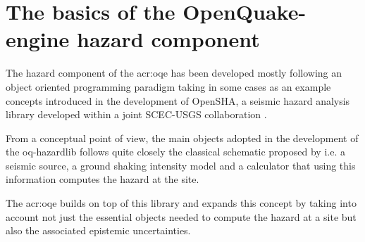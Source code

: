 \section{The basics of the OpenQuake-engine hazard component}
%
The hazard component of the \gls{acr:oqe} has been developed mostly following 
an object oriented programming paradigm taking in some cases as an example 
concepts introduced in the development of OpenSHA, a seismic hazard 
analysis library developed within a joint SCEC-USGS collaboration 
\parencite{field2003}. 

From a conceptual point of view, the main objects adopted in the development
of the oq-hazardlib follows quite closely the classical schematic proposed by
\textcite{reiter1991} i.e. a seismic source, a ground shaking intensity model 
and a calculator that using this information computes the hazard at the site.

The \gls{acr:oqe} builds on top of this library and expands this concept by
taking into account not just the essential objects needed to compute the hazard
at a site but also the associated epistemic uncertainties.
%
